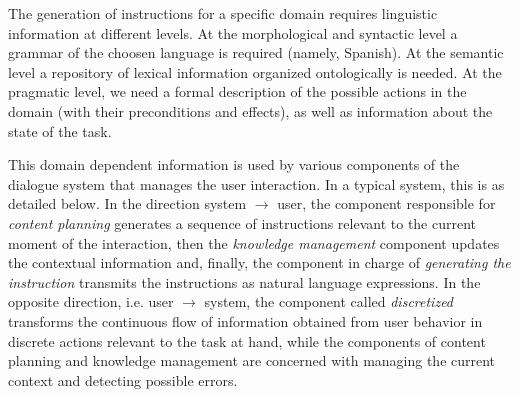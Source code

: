 The generation of instructions for a specific domain requires linguistic
information at different levels. At the morphological and syntactic level a
grammar of the choosen language is required (namely, Spanish). At the semantic
level a repository of lexical information organized ontologically is needed. At
the pragmatic level, we need a formal description of the possible actions in the
domain (with their preconditions and effects), as well as information about the
state of the task.


This domain dependent information is used by various components of the
dialogue system that manages the user interaction. In a typical system, this is
as detailed below. In the direction system $\rightarrow$ user, the component
responsible for \emph{content planning} generates a sequence of instructions
relevant to the current moment of the interaction, then the \emph{knowledge
management} component updates the contextual information and, finally, the
component in charge of \emph{generating the instruction} transmits the 
instructions as natural language expressions. In the
opposite direction, i.e. user $\rightarrow$ system, the component called
\emph{discretized} transforms the continuous flow of information obtained from
user behavior in discrete actions relevant to the task at hand, while the
components of content planning and knowledge management are concerned with
managing the current context and detecting possible errors.

